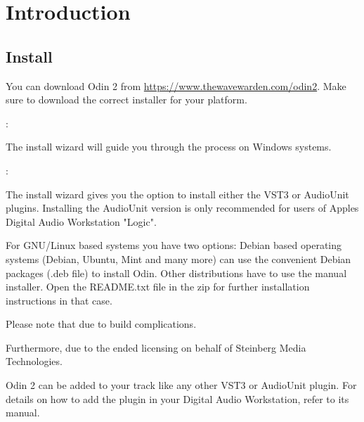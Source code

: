 \chapter{Introduction}


\section{Install}
You can download Odin 2 from \url{https://www.thewavewarden.com/odin2}. Make sure to download the correct installer for your platform.

\vspace{3mm}
:

The install wizard will guide you through the process on Windows systems.

\vspace{3mm}
:

The install wizard gives you the option to install either the VST3 or AudioUnit plugins. Installing the AudioUnit version is only recommended for users of Apples Digital Audio Workstation "Logic".

\vspace{3mm}

For GNU/Linux based systems you have two options: Debian based operating systems (Debian, Ubuntu, Mint and many more) can use the convenient Debian packages (.deb file) to install Odin. Other distributions have to use the manual installer. Open the README.txt file in the zip for further installation instructions in that case.

\vspace{5mm}
\begin{tcolorbox}[colback=yellow!10!white,
    colframe=white!20!black,
    center,
    valign=top,
    halign=left,
    center title,
    width=\textwidth]

    Please note that  due to build complications.
    
    Furthermore, due to the ended licensing on behalf of Steinberg Media Technologies.
\end{tcolorbox}

\vspace{5mm}

\vspace{5mm}
Odin 2 can be added to your track like any other VST3 or AudioUnit plugin. For details on how to add the plugin in your Digital Audio Workstation, refer to its manual.


